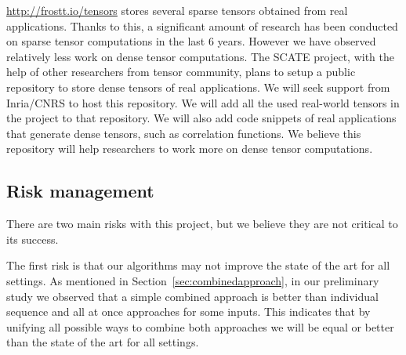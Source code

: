 \documentclass[a4paper,11pt]{article}
\begin{document}
	\noindent\url{http://frostt.io/tensors} stores several sparse tensors obtained from real applications. Thanks to this, a significant amount of research has been conducted on sparse tensor computations in the last 6 years. However we have observed relatively less work on dense tensor computations. The SCATE project, with the help of other researchers from tensor community, plans to setup a public repository to store dense tensors of real applications. We will seek support from Inria/CNRS to host this repository.
	We will add all the used real-world tensors in the project to that repository. We will also add code snippets of real applications that generate dense tensors, such as correlation functions. We believe this repository will help researchers to work more on dense tensor computations. 
	
	
	\subsection{Risk management}
	\label{sec:context:risk}
	
	There are two main risks with this project, but we believe they are not critical to its success.
	
	The first risk is that our algorithms may not improve the state of the art for all settings. As mentioned in Section~\ref{sec:combinedapproach}, in our preliminary study we observed that a simple combined approach is better than individual sequence and all at once approaches for some inputs. This indicates that by unifying all possible ways to combine both approaches we will be equal or better than the state of the art for all settings.
	
\end{document}
